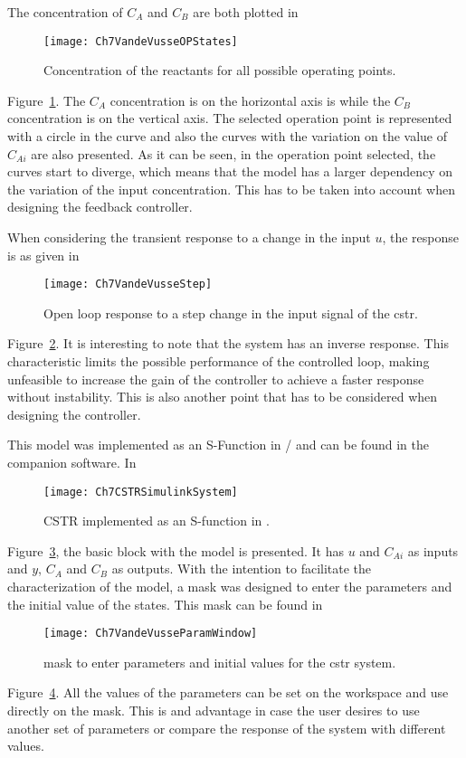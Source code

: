 The concentration of $C_A$ and $C_B$ are both plotted in %
\begin{figure}
	\centering
	\texttt{[image: Ch7VandeVusseOPStates]}
	\caption{Concentration of the reactants for all possible operating points.}
	\label{fig:Ch7VandeVusseOPStates}
\end{figure}
%
Figure~\ref{fig:Ch7VandeVusseOPStates}. The $C_A$ concentration is on the horizontal axis is while the $C_B$ concentration is on the vertical axis. The selected operation point is represented with a circle in the curve and also the curves with the variation on the value of $C_{Ai}$ are also presented. As it can be seen, in the operation point selected, the curves start to diverge, which means that the model has a larger dependency on the variation of the input concentration. This has to be taken into account when designing the feedback controller.

When considering the transient response to a change in the input $u$, the response is as given in %
\begin{figure}
	\centering
	\texttt{[image: Ch7VandeVusseStep]}
	\caption{Open loop response to a step change in the input signal of the \gls{cstr}.}
	\label{fig:Ch7VandeVusseStep}
\end{figure}
%
Figure~\ref{fig:Ch7VandeVusseStep}. It is interesting to note that the system has an inverse response. This characteristic limits the possible performance of the controlled loop, making unfeasible to increase the gain of the controller to achieve a faster response without instability. This is also another point that has to be considered when designing the controller.

This model was implemented as an S-Function in \matlab/\simulink{} and can be found in the companion software. In %
\begin{figure}[tb]
	\centering
	\texttt{[image: Ch7CSTRSimulinkSystem]}
	\caption{CSTR implemented as an S-function in \simulink.}
	\label{fig:Ch7CSTRSimulinkSystem}
\end{figure}
%
Figure~\ref{fig:Ch7CSTRSimulinkSystem}, the basic block with the model is presented. It has $u$ and $C_{Ai}$ as inputs and $y$, $C_A$ and $C_B$ as outputs. With the intention to facilitate the characterization of the model, a mask was designed to enter the parameters and the initial value of the states. This mask can be found in %
\begin{figure}[tb]
	\centering
	\texttt{[image: Ch7VandeVusseParamWindow]}
	\caption{\simulink{} mask to enter parameters and initial values for the \gls{cstr} system.}
	\label{fig:Ch7VandeVusseParamWindow}
\end{figure}  
Figure~\ref{fig:Ch7VandeVusseParamWindow}. All the values of the parameters can be set on the \matlab{} workspace and use directly on the mask. This is and advantage in case the user desires to use another set of parameters or compare the response of the system with different values.

